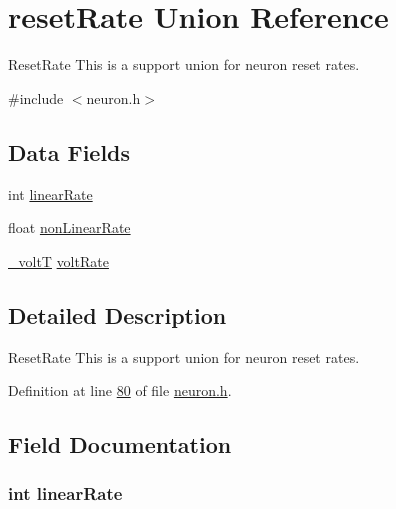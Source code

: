 \hypertarget{unionreset_rate}{}\section{reset\+Rate Union Reference}
\label{unionreset_rate}


Reset\+Rate This is a support union for neuron reset rates.  




{\ttfamily \#include $<$neuron.\+h$>$}

\subsection*{Data Fields}
\begin{DoxyCompactItemize}
\item 
int \hyperlink{unionreset_rate_a4bf8a23e4a9874ff73208c681eae1ced}{linear\+Rate}
\item 
float \hyperlink{unionreset_rate_a54aaba14ce85fd9c5d7b385d98727e36}{non\+Linear\+Rate}
\item 
\hyperlink{assist_8h_abe1fc1b8f9efd1187e564bcb8de7f815}{\+\_\+volt\+T} \hyperlink{unionreset_rate_a5a9af6c017d8b70e4db9283f2f7e726b}{volt\+Rate}
\end{DoxyCompactItemize}


\subsection{Detailed Description}
Reset\+Rate This is a support union for neuron reset rates. 



Definition at line \hyperlink{neuron_8h_source_l00080}{80} of file \hyperlink{neuron_8h_source}{neuron.\+h}.



\subsection{Field Documentation}
\hypertarget{unionreset_rate_a4bf8a23e4a9874ff73208c681eae1ced}{}
\subsubsection[{linear\+Rate}]{\setlength{\rightskip}{0pt plus 5cm}int linear\+Rate}\label{unionreset_rate_a4bf8a23e4a9874ff73208c681eae1ced}


